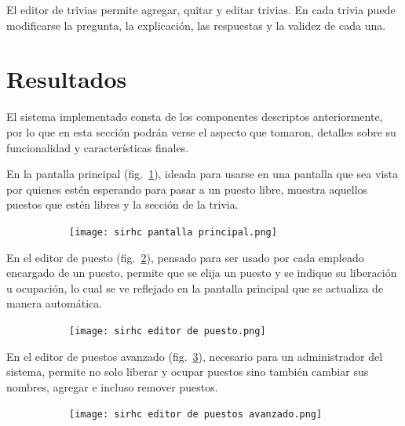 \documentclass{article}
\begin{document}
El editor de trivias permite agregar, quitar y editar trivias. En cada trivia puede modificarse la pregunta, la explicación, las respuestas y la validez de cada una.
\newpage
\section{Resultados}
El sistema implementado consta de los componentes descriptos anteriormente, por lo que en esta sección podrán verse el aspecto que tomaron, detalles sobre su funcionalidad y características finales.

En la pantalla principal (fig.~\ref{fig:pantallaPrincipal}), ideada para usarse en una pantalla que sea vista por quienes estén esperando para pasar a un puesto libre, muestra aquellos puestos que estén libres y la sección de la trivia.
\begin{figure}[H]
	\caption{Interfaz de la pantalla principal del sistema}
    \begin{subfigure}{1\textwidth}
	\texttt{[image: sirhc pantalla principal.png]}
    \end{subfigure}
	\label{fig:pantallaPrincipal}
\end{figure}
\vspace{-1.0\baselineskip}
En el editor de puesto (fig.~\ref{fig:editorPuesto}), pensado para ser usado por cada empleado encargado de un puesto, permite que se elija un puesto y se indique su liberación u ocupación, lo cual se ve reflejado en la pantalla principal que se actualiza de manera automática.
\begin{figure}[H]
	\caption{Interfaz del editor de puesto}
    \begin{subfigure}{1\textwidth}
	\texttt{[image: sirhc editor de puesto.png]}
    \end{subfigure}
	\label{fig:editorPuesto}
\end{figure}
\vspace{-1.0\baselineskip}
En el editor de puestos avanzado (fig.~\ref{fig:editorPuestosAvanzado}), necesario para un administrador del sistema, permite no solo liberar y ocupar puestos sino también cambiar sus nombres, agregar e incluso remover puestos.
\begin{figure}[H]
	\caption{Interfaz del editor de puestos avanzado}
    \begin{subfigure}{1\textwidth}
	\texttt{[image: sirhc editor de puestos avanzado.png]}
    \end{subfigure}
	\label{fig:editorPuestosAvanzado}
\end{figure}
\end{document}
